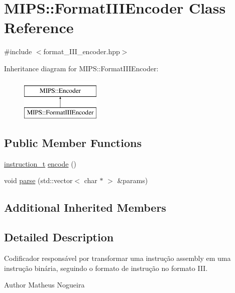 \hypertarget{classMIPS_1_1FormatIIIEncoder}{}\section{M\+I\+PS\+:\+:Format\+I\+I\+I\+Encoder Class Reference}
\label{classMIPS_1_1FormatIIIEncoder}


{\ttfamily \#include $<$format\+\_\+\+I\+I\+I\+\_\+encoder.\+hpp$>$}

Inheritance diagram for M\+I\+PS\+:\+:Format\+I\+I\+I\+Encoder\+:\begin{figure}[H]
\begin{center}
\leavevmode
\includegraphics[height=2.000000cm]{classMIPS_1_1FormatIIIEncoder}
\end{center}
\end{figure}
\subsection*{Public Member Functions}
\begin{DoxyCompactItemize}
\item 
\hyperlink{core_8hpp_aa514fd240a0e29abb2a2e4c805d7f1a4}{instruction\+\_\+t} \hyperlink{classMIPS_1_1FormatIIIEncoder_ab243fc73a602716a7ed15f13dbd2b695}{encode} ()
\item 
void \hyperlink{classMIPS_1_1FormatIIIEncoder_a06c8d98fe19c20d5e4f0986d7d500637}{parse} (std\+::vector$<$ char $\ast$ $>$ \&params)
\end{DoxyCompactItemize}
\subsection*{Additional Inherited Members}


\subsection{Detailed Description}
Codificador responsável por transformar uma instrução assembly em uma instrução binária, seguindo o formato de instrução no formato I\+II.

\begin{DoxyAuthor}{Author}
Matheus Nogueira 
\end{DoxyAuthor}


